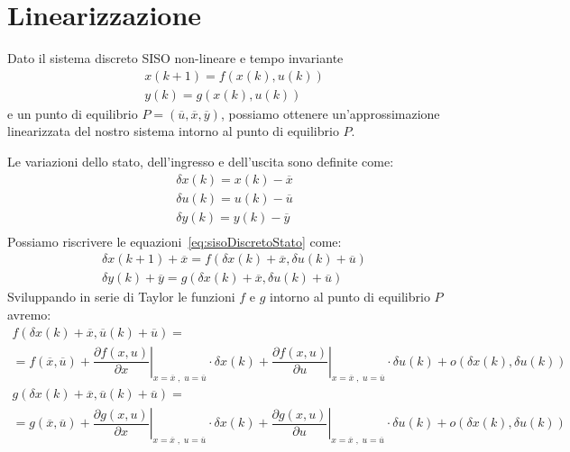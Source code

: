 \documentclass[a4paper]{report}
\begin{document}
\section{Linearizzazione}
Dato il sistema discreto SISO non-lineare e tempo invariante
\begin{equation}\label{eq:sisoDiscretoStato}
  \begin{array}{l}
    x (k + 1) = f(x(k), u(k))\\
    y(k) = g(x(k), u(k))
  \end{array}
\end{equation}
e un punto di equilibrio $P = (\overline{u}, \overline{x},
\overline{y})$, possiamo ottenere un'approssimazione linearizzata del
nostro sistema intorno al punto di equilibrio $P$.

Le variazioni dello stato, dell'ingresso e dell'uscita sono definite
come: 
\[
\begin{array}{l}
  \delta x(k) = x (k) - \overline{x}\\
  \delta u(k) = u (k) - \overline{u}\\
  \delta y(k) = y (k) - \overline{y}\\
\end{array}
\]
Possiamo riscrivere le equazioni~\ref{eq:sisoDiscretoStato} come:
\begin{equation}
  \begin{array}{l}
    \delta x (k + 1) + \overline{x} = f ( \delta x(k) + \overline{x},
    \delta u (k) + \overline{u})\\
    \delta y (k) + \overline{y} = g (\delta x (k) + \overline{x},
    \delta u(k) + \overline{u})
  \end{array}
\end{equation}
Sviluppando in serie di Taylor le funzioni $f$ e $g$ intorno al punto
di equilibrio $P$ avremo:
\[
\begin{array}{l}
  f (\delta x (k) + \overline{x}, \overline{u}(k) + \overline{u}) =\\
  = f(\overline{x}, \overline{u}) + \left. \dfrac{\partial f(x,
   u)}{\partial x}\right|_{x = \overline{x} \;,\; u = \overline{u}}
 \cdot \delta x(k) +  \left.\dfrac{\partial f(x,
   u)}{\partial u}\right|_{x = \overline{x} \;,\; u = \overline{u}}
 \cdot \delta u(k) + o (\delta x(k), \delta u(k))\\
 
  g (\delta x (k) + \overline{x}, \overline{u}(k) + \overline{u}) =\\
  = g(\overline{x}, \overline{u}) + \left. \dfrac{\partial g(x,
   u)}{\partial x}\right|_{x = \overline{x} \;,\; u = \overline{u}}
 \cdot \delta x(k) + \left. \dfrac{\partial g(x,
   u)}{\partial u}\right|_{x = \overline{x} \;,\; u = \overline{u}}
 \cdot \delta u(k) + o (\delta x(k), \delta u(k))
\end{array}
\]
\end{document}
